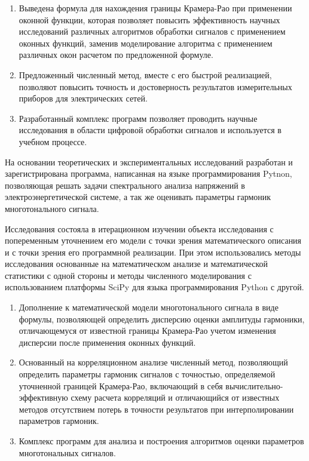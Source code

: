 {\influence} 

\begin{enumerate}
	\item Выведена формула для нахождения границы Крамера-Рао при применении оконной функции, которая позволяет повысить эффективность научных исследований различных алгоритмов обработки сигналов с применением оконных функций, заменив моделирование алгоритма с применением различных окон расчетом по предложенной формуле.
	
	\item Предложенный численный метод, вместе с его быстрой реализацией, позволяют повысить точность и достоверность результатов измерительных приборов для электрических сетей.
	
	\item Разработанный комплекс программ позволяет проводить научные исследования в области цифровой обработки сигналов и используется в учебном процессе.
\end{enumerate}

На основании теоретических и экспериментальных исследований разработан и зарегистрирована программа, написанная на языке программирования Pytnon, позволяющая решать задачи спектрального анализа напряжений в электроэнергетической системе, а так же оценивать параметры гармоник многотонального сигнала.


{\methods} 
Исследования состояла в итерационном изучении объекта исследования с попеременным уточнением его модели с точки зрения математического описания и с точки зрения его программной реализации. При этом использовались методы исследования основанные на математическом анализе и математической статистики с одной стороны и методы численного моделирования с использованием платформы SciPy для языка программирования Python с другой.



{}
\begin{enumerate}
  \item Дополнение к математической модели многотонального сигнала в виде формулы, позволяющей определить дисперсию оценки амплитуды гармоники, отличающемуся от известной границы Крамера-Рао учетом изменения дисперсии после применения оконных функций.
  \item Основанный на корреляционном анализе численный метод, позволяющий определить параметры гармоник сигналов с точностью, определяемой уточненной границей Крамера-Рао, включающий в себя вычислительно-эффективную схему расчета корреляций и отличающийся от известных методов отсутствием потерь в точности результатов при интерполировании параметров гармоник.
  \item Комплекс программ для анализа и построения алгоритмов оценки параметров многотональных сигналов.
\end{enumerate}


